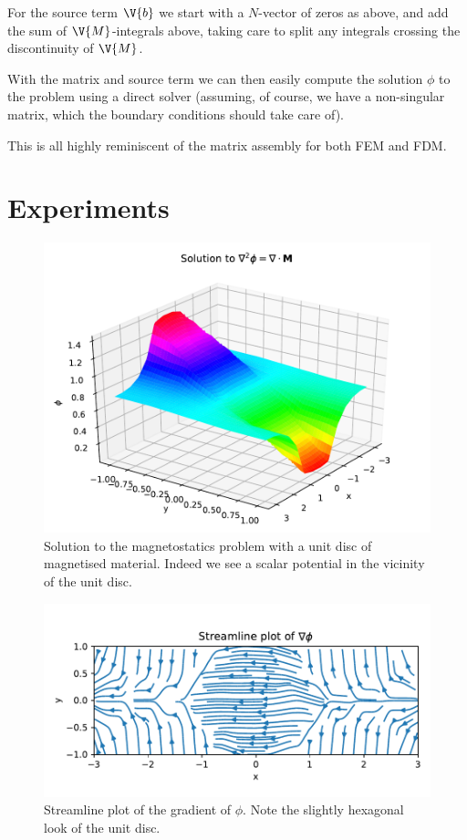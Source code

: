 \documentclass[sigconf]{acmart}
\begin{document}
For the source term $ \V{b} $ we start with a $ N $-vector of zeros as above, and add the sum of $ \V{M} $-integrals above, taking care to split any integrals crossing the discontinuity of $ \V{M} $.

With the matrix and source term we can then easily compute the solution $ \phi $ to the problem using a direct solver (assuming, of course, we have a non-singular matrix, which the boundary conditions should take care of).

This is all highly reminiscent of the matrix assembly for both FEM and FDM.

\section{Experiments}
\begin{figure}
	\centering
	\includegraphics[width=\linewidth]{ex_simple.pdf}
	\caption{Solution to the magnetostatics problem with a unit disc of magnetised material. Indeed we see a scalar potential in the vicinity of the unit disc.}
	\label{fig:ex_simple}
\end{figure}
\begin{figure}
	\centering
	\includegraphics[width=\linewidth]{ex_streams.pdf}
	\caption{Streamline plot of the gradient of $ \phi $. Note the slightly hexagonal look of the unit disc.}
	\label{fig:ex_streams}
\end{figure}
\end{document}
